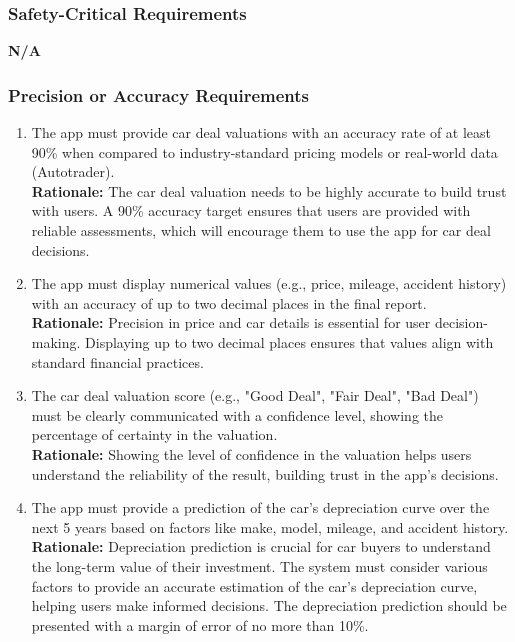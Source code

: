 \documentclass[]{article}
\begin{document}
\subsubsection{Safety-Critical Requirements}
\label{ssub:safety_critical_requirements}
\textbf{N/A}


\subsubsection{Precision or Accuracy Requirements}
\label{ssub:precision_or_accuracy_requirements}
\begin{enumerate}[{PR-PA}1.]
    \item The app must provide car deal valuations with an accuracy rate of at least 90\% when compared to industry-standard pricing models or real-world data (Autotrader). \\ 
    \textbf{Rationale:} The car deal valuation needs to be highly accurate to build trust with users. A 90\% accuracy target ensures that users are provided with reliable assessments, which will encourage them to use the app for car deal decisions.

    \item The app must display numerical values (e.g., price, mileage, accident history) with an accuracy of up to two decimal places in the final report.  \\
    \textbf{Rationale:} Precision in price and car details is essential for user decision-making. Displaying up to two decimal places ensures that values align with standard financial practices.

    \item The car deal valuation score (e.g., "Good Deal", "Fair Deal", "Bad Deal") must be clearly communicated with a confidence level, showing the percentage of certainty in the valuation.  \\
    \textbf{Rationale:} Showing the level of confidence in the valuation helps users understand the reliability of the result, building trust in the app's decisions.

    \item The app must provide a prediction of the car's depreciation curve over the next 5 years based on factors like make, model, mileage, and accident history.  \\
    \textbf{Rationale:} Depreciation prediction is crucial for car buyers to understand the long-term value of their investment. The system must consider various factors to provide an accurate estimation of the car's depreciation curve, helping users make informed decisions. The depreciation prediction should be presented with a margin of error of no more than 10\%.
\end{enumerate}
\end{document}
